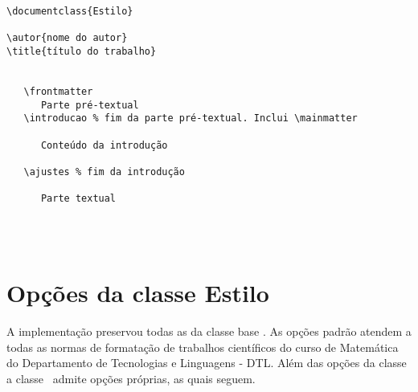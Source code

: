 \begin{tcolorbox}[title={Classe estilo: estrutura de um documento científico}]
\begin{lstlisting}
\documentclass{Estilo}

\autor{nome do autor}
\title{título do trabalho}


   \frontmatter
      Parte pré-textual
   \introducao % fim da parte pré-textual. Inclui \mainmatter

      Conteúdo da introdução

   \ajustes % fim da introdução

      Parte textual

   
   

\end{lstlisting}
\end{tcolorbox}

\section{Opções da classe Estilo}\label{opce}

A implementação preservou todas as  da classe base .
As opções padrão atendem a todas as normas de formatação de trabalhos científicos do curso de Matemática do Departamento de Tecnologias
e Linguagens - DTL. Além das opções da classe  a classe \estilo\
admite opções próprias, as quais seguem.

